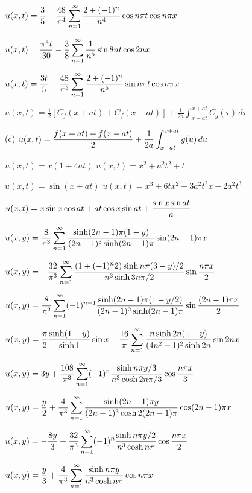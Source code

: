$u(x,t)=\displaystyle\frac{3}{5}-\frac{48}{\pi^4}\sum_{n=1}^\infty\frac{2+(-1)^n}{n^4}\cos n\pi t\cos n\pi x$

$u(x,t)=\displaystyle{\frac{\pi^4t}{30}-\frac{3}{8}\sum_{n=1}^\infty\frac{1}{n^5}\sin8nt\cos2nx}$

$u(x,t)=\displaystyle\frac{3t}{5}-\frac{48}{\pi^5}\sum_{n=1}^\infty\frac{2+(-1)^n}{n^5}\sin n\pi t\cos n\pi x$

$u(x,t)=\frac{1}{2}[C_f(x+at)+C_f(x-at)]+
\frac{1}{2a}\int_{x-at}^{x+at}C_g(\tau)\,d\tau$

(c)
$u(x,t)=\displaystyle\frac{f(x+at)+f(x-at)}{2}+
\frac{1}{2a}\int_{x-at}^{x+at}g(u)\,du$

$u(x,t)=x(1+4at)$
$u(x,t)=x^2+a^2t^2+t$

$u(x,t)=\sin(x+at)$
$u(x,t)=x^3+6tx^2+3a^2t^2x+2a^2t^3$


$u(x,t)=\displaystyle x\sin x\cos at+at\cos x\sin at+\frac{\sin x\sin at}{a}$




$u(x,y)=\displaystyle\frac{8}{\pi^3}\sum_{n=1}^\infty\frac{\sinh(2n-1)\pi(1-y)
}{(2n-1)^3\sinh(2n-1)\pi}
\sin(2n-1)\pi x$

$u(x,y)=\displaystyle-\frac{32}{\pi^3}\sum_{n=1}^\infty\frac{(1+(-1)^n2)\sinh
n\pi(3-y)/2}{n^3\sinh3n\pi/2}
\sin\frac{n\pi x}{2}$

$u(x,y)=\displaystyle\frac{8}{\pi^2}\sum_{n=1}^\infty(-1)^{n+1}\frac{
\sinh(2n-1)\pi(1-y/2)}{(2n-1)^2\sinh(2n-1)\pi}
\sin\frac{(2n-1)\pi x}{2}$

$u(x,y)=\displaystyle\frac{\pi}{2}\frac{\sinh(1-y)}{\sinh1}\sin
x-\frac{16}{\pi}\sum_{n=1}^\infty\frac{n\sinh2n(1-y)}{(4n^2-1)^2\sinh2n}\sin2nx$

$u(x,y)=\displaystyle3y+\frac{108}{\pi^3}\sum_{n=1}^\infty(-1)^n\frac{\sinh n\pi
y/3}{n^3\cosh2n\pi/3}\cos\frac{n\pi x}{3}$


$u(x,y)=\displaystyle\frac{y}{2}+\frac{4}{\pi^3}\sum_{n=1}^\infty\frac{
\sinh(2n-1)\pi y}{(2n-1)^3\cosh2(2n-1)\pi}
\cos(2n-1)\pi x$

$u(x,y)=\displaystyle-\frac{8y}{3}+\frac{32}{\pi^3}\sum_{n=1}^\infty(-1)^n\frac{
\sinh n\pi y/2}{n^3\cosh n\pi}\cos\frac{n\pi x}{2}$

$u(x,y)=\displaystyle\frac{y}{3}+\frac{4}{\pi^3}\sum_{n=1}^\infty\frac{\sinh n\pi y}{n^3\cosh n\pi}\cos n\pi x$

